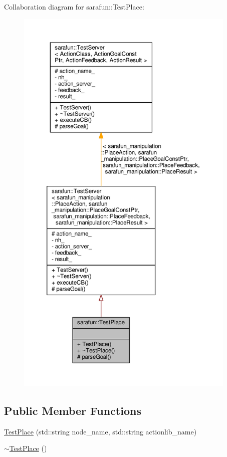Collaboration diagram for sarafun\-:\-:Test\-Place\-:
\nopagebreak
\begin{figure}[H]
\begin{center}
\leavevmode
\includegraphics[height=550pt]{dc/d88/classsarafun_1_1TestPlace__coll__graph}
\end{center}
\end{figure}
\subsection*{Public Member Functions}
\begin{DoxyCompactItemize}
\item 
\hyperlink{classsarafun_1_1TestPlace_a9f6925f4f93b3430e1687ed37999be59_a9f6925f4f93b3430e1687ed37999be59}{Test\-Place} (std\-::string node\-\_\-name, std\-::string actionlib\-\_\-name)
\item 
\hyperlink{classsarafun_1_1TestPlace_a419a921ef99346f693e1b661b5f668b7_a419a921ef99346f693e1b661b5f668b7}{$\sim$\-Test\-Place} ()
\end{DoxyCompactItemize}
